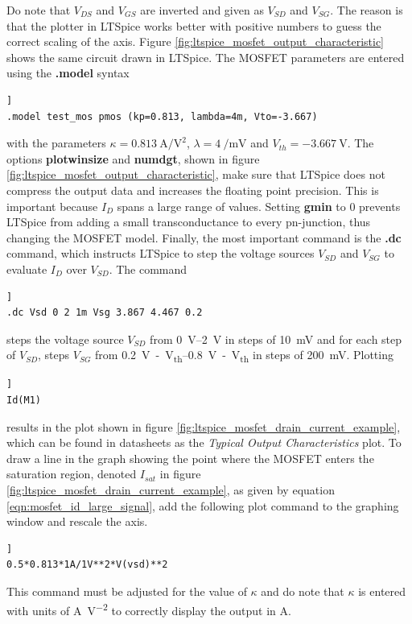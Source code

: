 \documentclass[12pt]{book}
\begin{document}
Do note that $V_{DS}$ and $V_{GS}$ are inverted and given as $V_{SD}$ and $V_{SG}$. The reason is that the plotter in LTSpice works better with positive numbers to guess the correct scaling of the axis. Figure \ref{fig:ltspice_mosfet_output_characteristic} shows the same circuit drawn in LTSpice. The MOSFET parameters are entered using the \textbf{.model} syntax
\begin{lstlisting}[frame=single, xleftmargin=5mm, xrightmargin=5mm, columns=fullflexible, morekeywords={model, dc}, keywordstyle=\bfseries, basicstyle=\rmfamily]]
.model test_mos pmos (kp=0.813, lambda=4m, Vto=-3.667)
\end{lstlisting}
with the parameters $\kappa = \qty[per-mode=power]{0.813}{\ampere \per \square\volt}$, $\lambda = \qty[per-mode=power]{4}{\per \milli \volt}$ and $V_{th} = \qty{-3.667}{\V}$. The options \textbf{plotwinsize} and \textbf{numdgt}, shown in figure \ref{fig:ltspice_mosfet_output_characteristic}, make sure that LTSpice does not compress the output data and increases the floating point precision. This is important because $I_D$ spans a large range of values. Setting \textbf{gmin} to \num{0} prevents LTSpice from adding a small transconductance to every pn-junction, thus changing the MOSFET model. Finally, the most important command is the \textbf{.dc} command, which instructs LTSpice to step the voltage sources $V_{SD}$ and $V_{SG}$ to evaluate $I_D$ over $V_{SD}$. The command
\begin{lstlisting}[frame=single, xleftmargin=5mm, xrightmargin=5mm, columns=fullflexible, morekeywords={model, dc}, keywordstyle=\bfseries, basicstyle=\rmfamily]]
.dc Vsd 0 2 1m Vsg 3.867 4.467 0.2
\end{lstlisting}
steps the voltage source $V_{SD}$ from \qtyrange[range-units = single]{0}{2}{\V} in steps of \qty{10}{\mV} and for each step of $V_{SD}$, steps $V_{SG}$ from \qtyrange[range-units = single]{0.2}{0.8}{\V -  V_{th}} in steps of \qty{200}{\mV}. Plotting
\begin{lstlisting}[frame=single, xleftmargin=5mm, xrightmargin=5mm, columns=fullflexible, morekeywords={model, dc}, keywordstyle=\bfseries, basicstyle=\rmfamily]]
Id(M1)
\end{lstlisting}
results in the plot shown in figure \ref{fig:ltspice_mosfet_drain_current_example}, which can be found in datasheets as the \textit{Typical Output Characteristics} plot.
To draw a line in the graph showing the point where the MOSFET enters the saturation region, denoted $I_{sat}$ in figure \ref{fig:ltspice_mosfet_drain_current_example}, as given by equation \ref{eqn:mosfet_id_large_signal}, add the following plot command to the graphing window and rescale the axis.
\begin{lstlisting}[frame=single, xleftmargin=5mm, xrightmargin=5mm, columns=fullflexible, morekeywords={model, dc}, keywordstyle=\bfseries, basicstyle=\rmfamily]]
0.5*0.813*1A/1V**2*V(vsd)**2
\end{lstlisting}
This command must be adjusted for the value of $\kappa$ and do note that $\kappa$ is entered with units of \unit{\A \per \square\volt} to correctly display the output in \unit{\A}.
\end{document}
